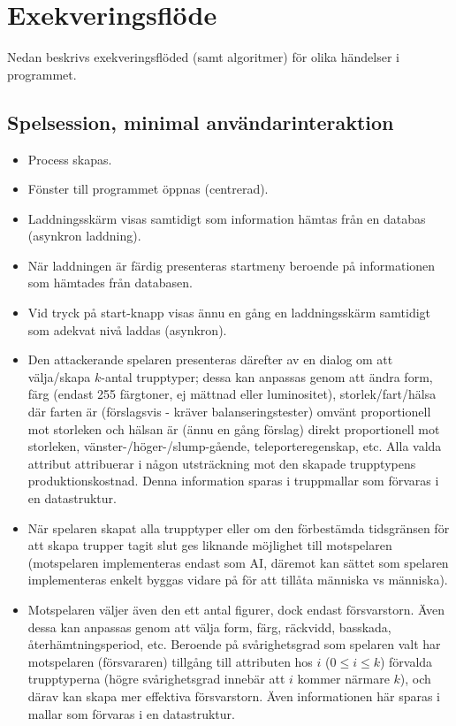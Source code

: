 \documentclass[10pt]{article}
\begin{document}
	\newpage
	\tableofcontents
	\newpage
	\section{Exekveringsflöde}
	Nedan beskrivs exekveringsflöded (samt algoritmer) för olika händelser i programmet.
	\subsection{Spelsession, minimal användarinteraktion}
	\begin{itemize}
		\item Process skapas.
		\item Fönster till programmet öppnas (centrerad).
		\item Laddningsskärm visas samtidigt som information hämtas från en databas (asynkron laddning).
		\item När laddningen är färdig presenteras startmeny beroende på informationen som hämtades från databasen.
		\item Vid tryck på start-knapp visas ännu en gång en laddningsskärm samtidigt som adekvat nivå laddas (asynkron).
		\item Den attackerande spelaren presenteras därefter av en dialog om att välja/skapa $k$-antal trupptyper; dessa
		kan anpassas genom att ändra form, färg (endast 255 färgtoner, ej mättnad eller luminositet), storlek/fart/hälsa där farten är (förslagsvis - kräver balanseringstester) omvänt proportionell mot storleken och hälsan är (ännu en gång förslag) direkt proportionell mot storleken, vänster-/höger-/slump-gående,
		teleporteregenskap, etc. Alla valda attribut attribuerar i någon utsträckning mot den skapade trupptypens produktionskostnad. Denna information sparas i truppmallar som förvaras i en datastruktur.
		\item När spelaren skapat alla trupptyper eller om den förbestämda tidsgränsen för att skapa trupper tagit slut ges liknande möjlighet till motspelaren (motspelaren implementeras endast som AI, däremot kan sättet som spelaren implementeras enkelt byggas vidare på för att tillåta människa vs människa).
		\item Motspelaren väljer även den ett antal figurer, dock endast försvarstorn. Även dessa kan anpassas genom att välja form, färg, räckvidd, basskada, återhämtningsperiod, etc. Beroende på svårighetsgrad som spelaren valt har motspelaren (försvararen) tillgång till attributen hos $i$ ($0 \leq i \leq k$) förvalda trupptyperna (högre svårighetsgrad innebär att $i$ kommer närmare $k$), och därav kan skapa mer effektiva försvarstorn. Även informationen här sparas i mallar som förvaras i en datastruktur.

\end{itemize}
\end{document}
